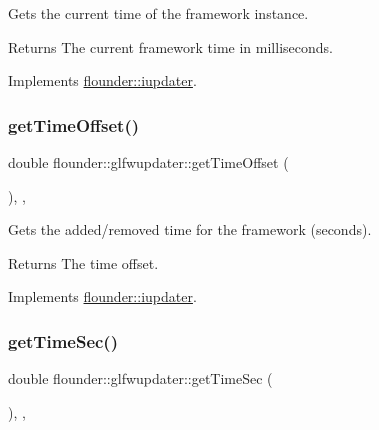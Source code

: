 Gets the current time of the framework instance. 

\begin{DoxyReturn}{Returns}
The current framework time in milliseconds. 
\end{DoxyReturn}


Implements \hyperlink{classflounder_1_1iupdater_a56548faad88ad85e0cb4bc96af0912d6}{flounder\+::iupdater}.

\mbox{\label{classflounder_1_1glfwupdater_a6393f60d2b0f84a78ccf14b0c55ae1ee}} 
\subsubsection{\texorpdfstring{get\+Time\+Offset()}{getTimeOffset()}}
{\footnotesize\ttfamily double flounder\+::glfwupdater\+::get\+Time\+Offset (\begin{DoxyParamCaption}{ }\end{DoxyParamCaption})\hspace{0.3cm}{\ttfamily [inline]}, {\ttfamily [override]}, {\ttfamily [virtual]}}



Gets the added/removed time for the framework (seconds). 

\begin{DoxyReturn}{Returns}
The time offset. 
\end{DoxyReturn}


Implements \hyperlink{classflounder_1_1iupdater_abd983cbbeed27f28e9be768a2d3b69f2}{flounder\+::iupdater}.

\mbox{\label{classflounder_1_1glfwupdater_a6982b83970693347bfa460adc04cf984}} 
\subsubsection{\texorpdfstring{get\+Time\+Sec()}{getTimeSec()}}
{\footnotesize\ttfamily double flounder\+::glfwupdater\+::get\+Time\+Sec (\begin{DoxyParamCaption}{ }\end{DoxyParamCaption})\hspace{0.3cm}{\ttfamily [inline]}, {\ttfamily [override]}, {\ttfamily [virtual]}}



